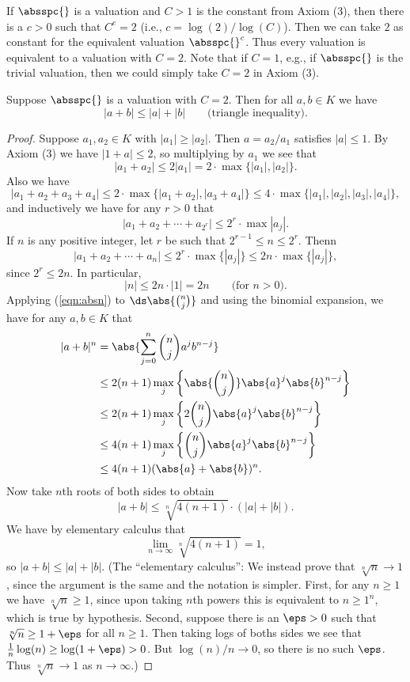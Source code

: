 If $\absspc{}$ is a valuation and $C>1$ is the constant from Axiom
(3), then there is a $c>0$ such that $C^c=2$ (i.e.,
$c=\log(2)/\log(C)$).  Then we can take $2$ as constant for the
equivalent valuation $\absspc{}^c$.  Thus every valuation is
equivalent to a valuation with $C=2$. Note that if $C=1$, e.g.,
if $\absspc{}$ is the trivial valuation, then we could
simply take $C=2$ in Axiom (3).
\begin{proposition}
Suppose $\absspc{}$ is a valuation with $C=2$.
Then for all $a, b\in K$ we have 
\begin{equation}\label{val3p}
  |a + b| \leq |a| + |b|\qquad \text{(triangle inequality)}.
\end{equation}
\end{proposition}
\begin{proof}
Suppose $a_1, a_2\in K$ with $|a_1|\geq|a_2|$.  Then $a=a_2/a_1$
satisfies $|a|\leq 1$.  By Axiom (3) we have $|1+a|\leq 2$, so
multiplying by $a_1$ we see that
$$|a_1+ a_2|\leq 2|a_1| = 2\cdot\max\{|a_1|,|a_2|\}.$$
Also we have 
$$|a_1+ a_2 + a_3 + a_4|\leq 2\cdot\max\{|a_1+a_2|,|a_3+a_4|\}
   \leq 4\cdot \max\{|a_1|,|a_2|,|a_3|,|a_4|\},
$$
and inductively we have for any $r>0$ that
$$|a_1 + a_2 + \cdots  + a_{2^r}| \leq 2^r\cdot\max{|a_j|}.$$
If $n$ is any positive integer, let $r$ be such
that $2^{r-1}\leq n\leq 2^r$. Thenn
$$|a_1 + a_2 + \cdots + a_{n}| \leq 2^r\cdot \max\{|a_j|\} 
 \leq 2n\cdot \max\{|a_j|\},$$
since $2^r\leq 2n$.  In particular,
\begin{equation}\label{eqn:absn}
  |n| \leq 2n\cdot |1| = 2n \qquad\text{(for $n>0$)}.
\end{equation}
Applying (\ref{eqn:absn}) to $\ds\abs{\binom{n}{j}}$ and using
the binomial expansion, we have for any $a,b\in K$ that
\begin{align*}
|a+b|^n &= \abs{\sum_{j=0}^n \binom{n}{j} a^j b^{n-j}}\\
   &\leq  2(n+1)\max_j\left\{ \abs{\binom{n}{j}} \abs{a}^j\abs{b}^{n-j}\right\}\\
   &\leq  2(n+1)\max_j\left\{ 2 \binom{n}{j} \abs{a}^j\abs{b}^{n-j}\right\}\\
   &\leq  4(n+1)\max_j\left\{ \binom{n}{j} \abs{a}^j\abs{b}^{n-j}\right\}\\
   &\leq  4(n+1)(\abs{a}+\abs{b})^n.
\end{align*}
Now take $n$th roots of both sides to obtain
$$
|a+b| \leq \sqrt[n]{4(n+1)}\cdot (|a| + |b|).
$$
We have by elementary calculus that
$$
  \lim_{n\to \infty} \sqrt[n]{4(n+1)} = 1,
$$ so $|a+b| \leq |a|+|b|$.  
(The ``elementary calculus'': We instead prove that $\sqrt[n]{n}\to 1$, since
the argument is the same and the notation is simpler.  First, for any
$n\geq 1$ we have $\sqrt[n]{n}\geq 1$, since upon taking $n$th powers
this is equivalent to $n\geq 1^n$, which is true by hypothesis.
Second, suppose there is an $\eps>0$ such that $\sqrt[n]{n}\geq
1+\eps$ for all $n\geq 1$.  Then taking logs of boths sides we see
that $\frac{1}{n}\log(n)\geq \log(1+\eps) > 0$.  But 
 $\log(n)/n\to 0$, so there is no such $\eps$.  Thus
$\sqrt[n]{n}\to 1$ as $n\to \infty$.)
\end{proof}

